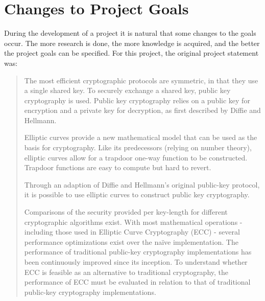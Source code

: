 \section{Changes to Project Goals}

During the development of a project it is natural that some changes to the goals occur. The more research is done,
the more knowledge is acquired, and the better the project goals can be specified. For this project, the original
project statement was:

\begin{quote}
	The most efficient cryptographic protocols are symmetric, in that they use a single shared key. To securely exchange a shared key, public key cryptography is used. Public key cryptography relies on a public key for encryption and a private key for decryption, as first described by Diffie and Hellmann.

	Elliptic curves provide a new mathematical model that can be used as the basis for cryptography. Like its predecessors (relying on number theory), elliptic curves allow for a trapdoor one-way function to be constructed. Trapdoor functions are easy to compute but hard to revert.

	Through an adaption of Diffie and Hellmann’s original public-key protocol, it is possible to use elliptic curves to construct public key cryptography.

	Comparisons of the security provided per key-length for different cryptographic algorithms exist. With most mathematical operations - including those used in Elliptic Curve Cryptography (ECC) - several performance optimizations exist over the naïve implementation. The performance of traditional public-key cryptography implementations has been continuously improved since its inception. To understand whether ECC is feasible as an alternative to traditional cryptography, the performance of ECC must be evaluated in relation to that of traditional public-key cryptography implementations.
\end{quote}